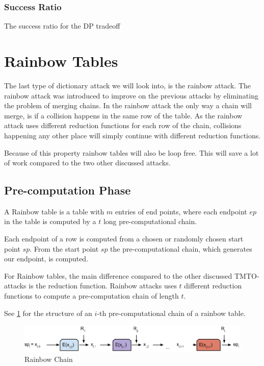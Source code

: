 \subsubsection{Success Ratio}
The success ratio for the DP tradeoff
\subsubsection{}
\section{Rainbow Tables}
\label{sec:raintheory}

The last type of dictionary attack we will look into, is the rainbow
attack. The rainbow attack was introduced to improve on the previous
attacks by eliminating the problem of merging chains. In the rainbow
attack the only way a chain will merge, is if a collision happens in
the same row of the table. As the rainbow attack uses different
reduction functions for each row of the chain, collisions happening
any other place will simply continue with different reduction
functions.

Because of this property rainbow tables will also be loop free. This
will save a lot of work compared to the two other discussed attacks.

\subsection{Pre-computation Phase}

A Rainbow table is a table with $m$ entries of end points, where each endpoint
$ep$ in the table is computed by a $t$ long pre-computational chain. 

Each endpoint of a row is computed from a chosen or randomly chosen
start point $sp$. From the start point $sp$ the pre-computational chain,
which generates our endpoint, is computed.

For Rainbow tables, the main difference compared to the other
discussed TMTO-attacks is the reduction function. Rainbow attacks
uses $t$ different reduction functions to compute a pre-computation
chain of length $t$.

See \ref{fig:rainbowchain} for the structure of an $i$-th
pre-computational chain of a rainbow table.

\begin{figure}[H]
  \centering
  \includegraphics[scale=0.4]{figures/rainbowchain.png}
  \caption{Rainbow Chain}
  \label{fig:rainbowchain}
\end{figure}

